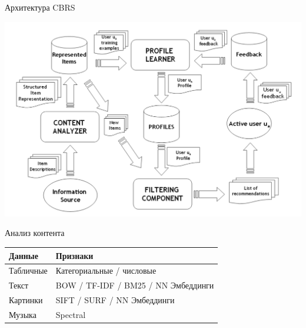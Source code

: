 \documentclass[11pt,aspectratio=169,handout=true]{beamer}
\begin{document}
\begin{frame}{Архитектура CBRS \cite{RSHB}}

\begin{center}
\includegraphics[scale=0.3]{images/cbf.png}
\end{center}

\end{frame}

\begin{frame}{Анализ контента}

\begin{center}
\begin{tabular}{ l | p{20em} }
{\bf Данные} & {\bf Признаки} \\
\hline
Табличные \pause &  Категориальные / числовые \\
Текст \pause & BOW / TF-IDF / BM25 / NN Эмбеддинги \\
Картинки \pause & SIFT / SURF / NN Эмбеддинги \\
Музыка \pause & Spectral 
\end{tabular}
\end{center}

\end{frame}
\end{document}
